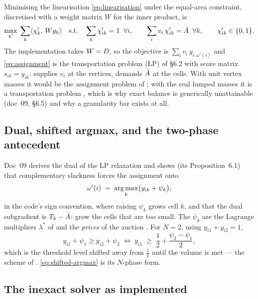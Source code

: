 \documentclass[11pt,a4paper]{article}
\begin{document}
Minimising the linearisation \eqref{eq:linearisation} under the equal-area
constraint, discretised with a weight matrix $W$ for the inner product, is
\begin{equation}
  \max_{\chi'} \;\sum_k \langle \chi'_k,\, W y_k \rangle
  \quad\text{s.t.}\quad
  \sum_k \chi'_{ik} = 1 \;\;\forall i, \qquad
  \sum_i v_i\, \chi'_{ik} = \bar{A} \;\;\forall k, \qquad
  \chi'_{ik} \in \{0, 1\}.
  \label{eq:assignment}
\end{equation}
The implementation takes $W = D$, so the objective is
$\sum_{i} v_i\, y_{i,\omega'(i)}$ and \eqref{eq:assignment} is the transportation
problem (LP) of  \S6.2 with score matrix
$s_{ik} = y_{ik}$: supplies $v_i$ at the vertices, demands $\bar{A}$ at the cells.
With unit vertex masses it would be the assignment problem of
\cite{jacobs2018auction}; with the real lumped masses it is a transportation
problem \cite{ahuja1993network}, which is why exact balance is generically
unattainable (doc~09, \S6.5) and why a granularity bar exists at all.

\subsection{Dual, shifted argmax, and the two-phase antecedent}
\label{sec:dual}

Doc~09 derives the dual of the LP relaxation and shows (its Proposition~6.1) that
complementary slackness forces the assignment onto
\begin{equation}
  \omega'(i) \;=\; \operatorname*{arg\,max}_k \bigl( y_{ik} + \psi_k \bigr),
  \label{eq:shifted-argmax}
\end{equation}
in the code's sign convention, where raising $\psi_k$ grows cell $k$, and that the
dual subgradient is $T_k - \bar{A}$: grow the cells that are too small. The
$\psi_k$ are the Lagrange multipliers $\lambda^*$ of \cite[eq.~(11)]{jacobs2018auction}
and the \emph{prices} of the auction \cite{bertsekas1988auction}. For $N = 2$,
using $y_{i1} + y_{i2} = 1$,
\begin{equation}
  y_{i1} + \psi_1 \ge y_{i2} + \psi_2
  \;\Longleftrightarrow\;
  y_{i1} \;\ge\; \frac12 + \frac{\psi_2 - \psi_1}{2},
  \label{eq:ruuth-wetton}
\end{equation}
which is the threshold level shifted away from $\tfrac12$ until the volume is met
--- the scheme of \cite{ruuth2003volume}. \eqref{eq:shifted-argmax} is its
$N$-phase form.

\subsection{The inexact solver as implemented}
\label{sec:inexact}
\end{document}
